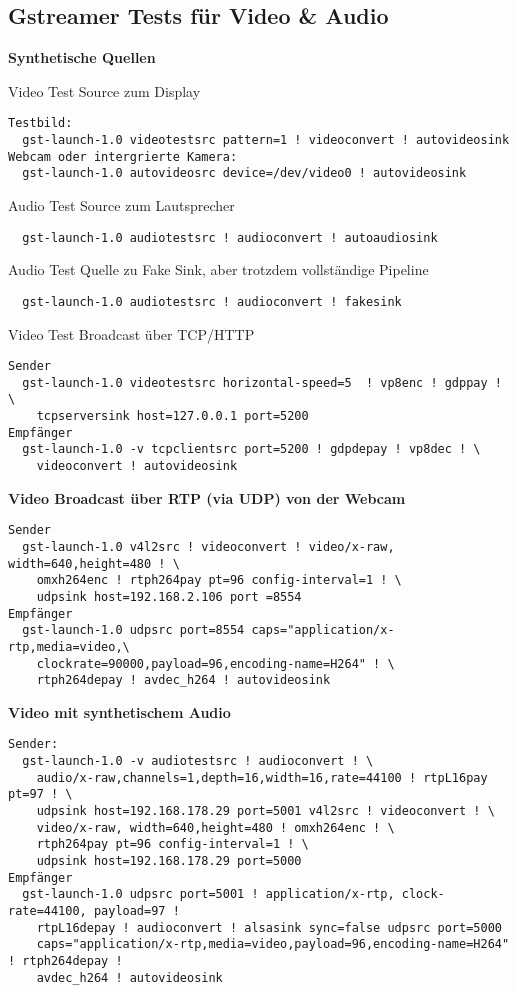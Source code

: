 \subsection{Gstreamer Tests für Video \& Audio}

\textbf{Synthetische Quellen}

Video Test Source zum Display
\begin{verbatim}
Testbild:
  gst-launch-1.0 videotestsrc pattern=1 ! videoconvert ! autovideosink
Webcam oder intergrierte Kamera: 
  gst-launch-1.0 autovideosrc device=/dev/video0 ! autovideosink
\end{verbatim}

Audio Test Source zum Lautsprecher
\begin{verbatim}
  gst-launch-1.0 audiotestsrc ! audioconvert ! autoaudiosink
\end{verbatim}

Audio Test Quelle zu Fake Sink, aber trotzdem vollständige Pipeline
\begin{verbatim}
  gst-launch-1.0 audiotestsrc ! audioconvert ! fakesink
\end{verbatim}

Video Test Broadcast über TCP/HTTP
\begin{verbatim}
Sender
  gst-launch-1.0 videotestsrc horizontal-speed=5  ! vp8enc ! gdppay ! \
    tcpserversink host=127.0.0.1 port=5200
Empfänger
  gst-launch-1.0 -v tcpclientsrc port=5200 ! gdpdepay ! vp8dec ! \
    videoconvert ! autovideosink
\end{verbatim}

\textbf{Video Broadcast über RTP (via UDP) von der Webcam}
\begin{verbatim}
Sender
  gst-launch-1.0 v4l2src ! videoconvert ! video/x-raw, width=640,height=480 ! \
    omxh264enc ! rtph264pay pt=96 config-interval=1 ! \
    udpsink host=192.168.2.106 port =8554
Empfänger
  gst-launch-1.0 udpsrc port=8554 caps="application/x-rtp,media=video,\
    clockrate=90000,payload=96,encoding-name=H264" ! \
    rtph264depay ! avdec_h264 ! autovideosink
\end{verbatim}

\textbf{Video mit synthetischem Audio}
\begin{verbatim}
Sender:
  gst-launch-1.0 -v audiotestsrc ! audioconvert ! \
    audio/x-raw,channels=1,depth=16,width=16,rate=44100 ! rtpL16pay pt=97 ! \
    udpsink host=192.168.178.29 port=5001 v4l2src ! videoconvert ! \
    video/x-raw, width=640,height=480 ! omxh264enc ! \
    rtph264pay pt=96 config-interval=1 ! \
    udpsink host=192.168.178.29 port=5000
Empfänger
  gst-launch-1.0 udpsrc port=5001 ! application/x-rtp, clock-rate=44100, payload=97 ! 
    rtpL16depay ! audioconvert ! alsasink sync=false udpsrc port=5000 
    caps="application/x-rtp,media=video,payload=96,encoding-name=H264" ! rtph264depay !     
    avdec_h264 ! autovideosink
\end{verbatim}

